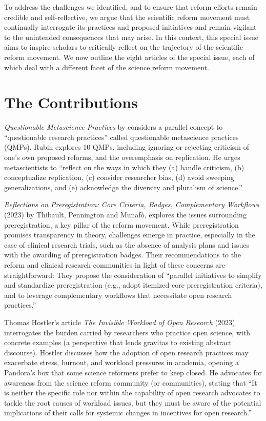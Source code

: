 \documentclass[authordate, editorial,noabstract]{jote-new-article}
\begin{document}
	To address the challenges we identified, and to ensure that reform efforts remain credible and self-reflective, we argue that the scientific reform movement must continually interrogate its practices and proposed initiatives and remain vigilant to the unintended consequences that may arise. In this context, this special issue aims to inspire scholars to critically reflect on the trajectory of the scientific reform movement. We now outline the eight articles of the special issue, each of which deal with a different facet of the science reform movement.



	\section{The Contributions}



	\emph{Questionable Metascience Practices} by \textcite{Mark Rubin2023} considers a parallel concept to “questionable research practices” called questionable metascience practices (QMPs). Rubin explores 10 QMPs, including ignoring or rejecting criticism of one's own proposed reforms, and the overemphasis on replication. He urges metascientists to “reflect on the ways in which they (a) handle criticism, (b) conceptualize replication, (c) consider researcher bias, (d) avoid sweeping generalizations, and (e) acknowledge the diversity and pluralism of science.”



	\emph{Reflections on Preregistration: Core Criteria, Badges, Complementary Workflows }(2023) by Thibault, Pennington and Munafò, explores the issues surrounding preregistration, a key pillar of the reform movement. While preregistration promises transparency in theory, challenges emerge in practice, especially in the case of clinical research trials, such as the absence of analysis plans and issues with the awarding of preregistration badges. Their recommendations to the reform and clinical research communities in light of these concerns are straightforward: They propose the consideration of “parallel initiatives to simplify and standardize preregistration (e.g., adopt itemized core preregistration criteria), and to leverage complementary workflows that necessitate open research practices.”



	Thomas Hostler's article \emph{The Invisible Workload of Open Research} (2023) interrogates the burden carried by researchers who practice open science, with concrete examples (a perspective that lends gravitas to existing abstract discourse)\emph{.} Hostler discusses how the adoption of open research practices may exacerbate stress, burnout, and workload pressures in academia, opening a Pandora's box that some science reformers prefer to keep closed. He advocates for awareness from the science reform community (or communities), stating that “It is neither the specific role nor within the capability of open research advocates to tackle the root causes of workload issues, but they must be aware of the potential implications of their calls for systemic changes in incentives for open research.”
\end{document}
